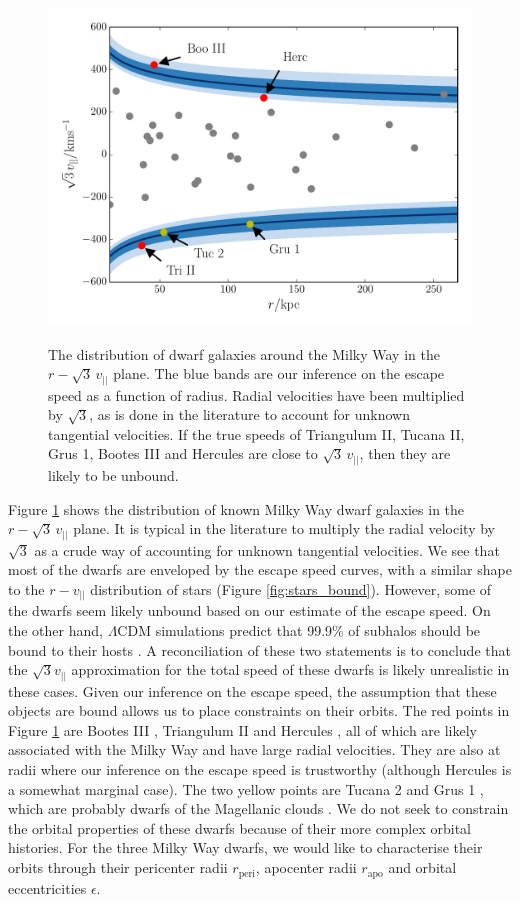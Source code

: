 \documentclass[useAMS,twocolumn,usenatbib]{mn2e}
\def\vlos{{v_{||}}}
\def\rp{{r_\mathrm{peri}}}
\def\ra{{r_\mathrm{apo}}}
\def\ecc{{\epsilon}}
\begin{document}
\begin{figure}
\includegraphics[width=\columnwidth]{plots/sats}\\ 
\caption{The distribution of dwarf galaxies around the Milky Way in the $r-\sqrt{3}\,\vlos$ plane. 
The blue bands are our inference on the escape speed as a function of radius. 
Radial velocities have been multiplied by $\sqrt{3}$, as is done in the literature to account for unknown tangential velocities. 
If the true speeds of Triangulum II, Tucana II, Grus 1, Bootes III and Hercules are close to $\sqrt{3}\,\vlos$, then they are likely to be unbound.}
\label{fig:sats}
\end{figure}

Figure \ref{fig:sats} shows the distribution of known Milky Way dwarf galaxies in the $r-\sqrt{3}\,\vlos$ plane. 
It is typical in the literature to multiply the radial velocity by $\sqrt{3}$ as a crude way of accounting for unknown tangential velocities. 
We see that most of the dwarfs are enveloped by the escape speed curves, with a similar shape to the $r-\vlos$ distribution of stars (Figure \ref{fig:stars_bound}).
However, some of the dwarfs seem likely unbound based on our estimate of the escape speed. 
On the other hand, $\Lambda$CDM simulations predict that 99.9\% of subhalos should be bound to their hosts \citep{Bo13}. 
A reconciliation of these two statements is to conclude that the $\sqrt{3}\vlos$ approximation for the total speed of these dwarfs is likely unrealistic in these cases. 
Given our inference on the escape speed, the assumption that these objects are bound allows us to place constraints on their orbits. 
The red points in Figure \ref{fig:sats} are Bootes III \citep{Gr09}, Triangulum II \citep{La15} and Hercules \citep{Be07}, all of which are likely associated with the Milky Way and have large radial velocities. 
They are also at radii where our inference on the escape speed is trustworthy (although Hercules is a somewhat marginal case).  
The two yellow points are Tucana 2 and Grus 1 \citep{Ko15,Be15}, which are probably dwarfs of the Magellanic clouds \citep{Je16}. 
We do not seek to constrain the orbital properties of these dwarfs because of their more complex orbital histories. 
For the three Milky Way dwarfs, we would like to characterise their orbits through their pericenter radii $\rp$, apocenter radii $\ra$ and orbital eccentricities $\ecc$.
\end{document}
